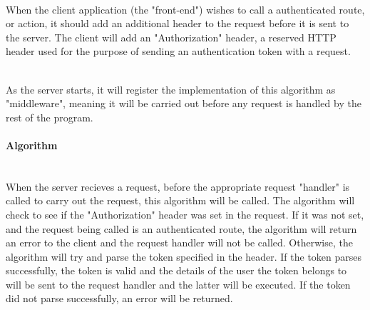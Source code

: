 \documentclass[../../main.tex]{subfiles}
\begin{document}
\noindent \\ When the client application (the "front-end") wishes to call a authenticated route, or action, it
should add an additional header to the request before it is sent to the server. The client will add an "Authorization"
header, a reserved HTTP header used for the purpose of sending an authentication token with a request.

\noindent \\ As the server starts, it will register the implementation of this algorithm as "middleware", meaning
it will be carried out before any request is handled by the rest of the program.

\paragraph{Algorithm}

\noindent \\ When the server recieves a request, before the appropriate request "handler" is called to carry
out the request, this algorithm will be called. The algorithm will check to see if the "Authorization" header
was set in the request. If it was not set, and the request being called is an authenticated route, the
algorithm will return an error to the client and the request handler will not be called. Otherwise, the algorithm
will try and parse the token specified in the header. If the token parses successfully, the token is valid and the
details of the user the token belongs to will be sent to the request handler and the latter will be executed.
If the token did not parse successfully, an error will be returned.

\paragraph{} %
\end{document}
